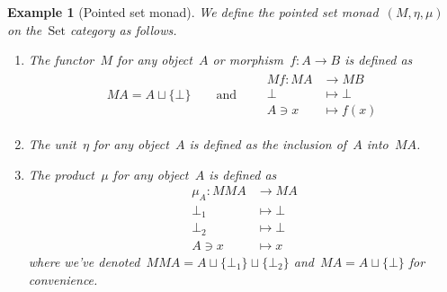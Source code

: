 \documentclass[a4paper]{article}
\theoremstyle{plain}
\newtheorem{example}[theorem]{Example}
\theoremstyle{definition}
\newcommand{\Set}{\mathrm{Set}}
\begin{document}
\begin{example}[Pointed set monad]
    \label{monad:maybe}
    We define the pointed set monad~\((M,\eta,\mu)\) on the~\(\Set\) category as
    follows.
    \begin{enumerate}
        \item The functor~\(M\) for any object~\(A\) or
            morphism~\(f:A\longrightarrow B\) is defined as
            \begin{gather*}
                MA = A\sqcup\{\bot\}
                \qquad\text{and}\qquad
                \begin{split}
                    Mf:MA&\longrightarrow MB \\
                    \bot&\longmapsto\bot \\
                    A\ni x&\longmapsto f(x)
                \end{split}
            \end{gather*}
        \item The unit~\(\eta\) for any object~\(A\) is defined as the inclusion
            of~\(A\) into~\(MA\).
        \item The product~\(\mu\) for any object~\(A\) is defined as
            \begin{align*}
                \mu_{A}:MMA&\longrightarrow MA \\
                \bot_{1}&\longmapsto \bot \\
                \bot_{2}&\longmapsto \bot \\
                A\ni x&\longmapsto x
            \end{align*}
            where we've denoted~\(MMA=A\sqcup\{\bot_{1}\}\sqcup\{\bot_{2}\}\)
            and~\(MA=A\sqcup\{\bot\}\) for convenience.
    \end{enumerate}
\end{example}
\end{document}
